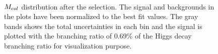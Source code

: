 \begin{figure}[htbp] 
     \centering
     \\
     \caption{ $M_{col}$ distribution after the selection. The signal and backgrounds in the plots have been normalized to the best fit values. The gray bands shows the total uncertainties in each bin and the signal is plotted with the branching ratio of 0.69\% of the Higgs decay branching ratio for visualization purpose. }
     \label{fig:etaubdtbasedpostfit}
\end{figure}



